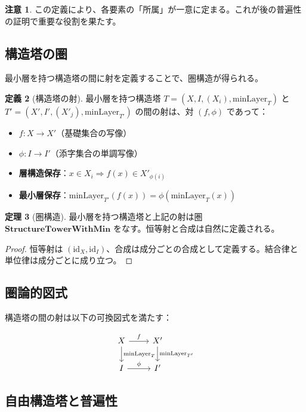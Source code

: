 \documentclass[a4paper,12pt]{article}
\theoremstyle{definition}
\newtheorem{definition}{定義}[section]
\newtheorem{theorem}[definition]{定理}
\newtheorem{remark}[definition]{注意}
\begin{document}
\begin{remark}
この定義により、各要素の「所属」が一意に定まる。これが後の普遍性の証明で重要な役割を果たす。
\end{remark}

\subsection{構造塔の圏}

最小層を持つ構造塔の間に射を定義することで、圏構造が得られる。

\begin{definition}[構造塔の射]
最小層を持つ構造塔 $T = (X, I, (X_i), \text{minLayer}_T)$ と $T' = (X', I', (X'_j), \text{minLayer}_{T'})$ の間の射は、対 $(f, \phi)$ であって：
\begin{itemize}
\item $f : X \to X'$（基礎集合の写像）
\item $\phi : I \to I'$（添字集合の単調写像）
\item \textbf{層構造保存}：$x \in X_i \Rightarrow f(x) \in X'_{\phi(i)}$
\item \textbf{最小層保存}：$\text{minLayer}_{T'}(f(x)) = \phi(\text{minLayer}_T(x))$
\end{itemize}
\end{definition}

\begin{theorem}[圏構造]
最小層を持つ構造塔と上記の射は圏 $\mathbf{StructureTowerWithMin}$ をなす。恒等射と合成は自然に定義される。
\end{theorem}

\begin{proof}
恒等射は $(\text{id}_X, \text{id}_I)$、合成は成分ごとの合成として定義する。結合律と単位律は成分ごとに成り立つ。
\end{proof}

\subsection{圏論的図式}

構造塔の間の射は以下の可換図式を満たす：

\[
\begin{tikzcd}
X \arrow[r, "f"] \arrow[d, "\text{minLayer}_T"] & X' \arrow[d, "\text{minLayer}_{T'}"] \\
I \arrow[r, "\phi"] & I'
\end{tikzcd}
\]

\subsection{自由構造塔と普遍性}
\end{document}
